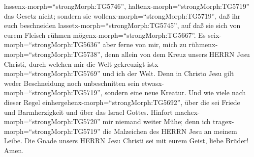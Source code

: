 lassenx-morph=``strongMorph:TG5746'',
haltenx-morph=``strongMorph:TG5719'' das Gesetz nicht; sondern sie
wollenx-morph=``strongMorph:TG5719'', daß ihr euch beschneiden
lassetx-morph=``strongMorph:TG5745'', auf daß sie sich von eurem Fleisch
rühmen mögenx-morph=``strongMorph:TG5667''.  Es
seix-morph=``strongMorph:TG5636'' aber ferne von mir, mich zu
rühmenx-morph=``strongMorph:TG5738'', denn allein von dem Kreuz unsers
HERRN Jesu Christi, durch welchen mir die Welt gekreuzigt
istx-morph=``strongMorph:TG5769'' und ich der Welt.  Denn
in Christo Jesu gilt weder Beschneidung noch unbeschnitten sein
etwasx-morph=``strongMorph:TG5719'', sondern eine neue Kreatur.
 Und wie viele nach dieser Regel
einhergehenx-morph=``strongMorph:TG5692'', über die sei Friede und
Barmherzigkeit und über das Israel Gottes.  Hinfort
machex-morph=``strongMorph:TG5720'' mir niemand weiter Mühe; denn ich
tragex-morph=``strongMorph:TG5719'' die Malzeichen des HERRN Jesu an
meinem Leibe.  Die Gnade unsers HERRN Jesu Christi sei mit
eurem Geist, liebe Brüder! Amen.
